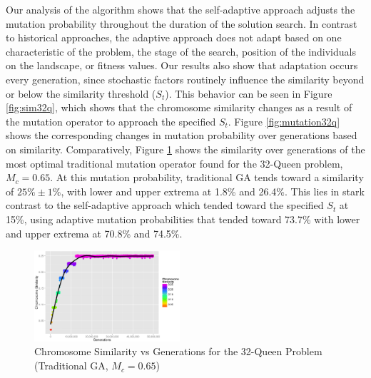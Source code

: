 \documentclass[conference]{IEEEtran}
\begin{document}
Our analysis of the algorithm shows that the self-adaptive approach adjusts the mutation probability throughout the duration of the solution search. In contrast to historical approaches, the adaptive approach does not adapt based on one characteristic of the problem, the stage of the search, position of the individuals on the landscape, or fitness values. Our results also show that adaptation occurs every generation, since stochastic factors routinely influence the similarity beyond or below the similarity threshold ($S_{t}$). This behavior can be seen in Figure \ref{fig:sim32q}, which shows that the chromosome similarity changes as a result of the mutation operator to approach the specified $S_{t}$. Figure \ref{fig:mutation32q} shows the corresponding changes in mutation probability over generations based on similarity. Comparatively, Figure \ref{fig:bestfixedn32q} shows the similarity over generations of the most optimal traditional mutation operator found for the 32-Queen problem, $M_{c} = 0.65$. At this mutation probability, traditional GA tends toward a similarity of $25\% \pm 1\%$, with lower and upper extrema at 1.8\% and 26.4\%. This lies in stark contrast to the self-adaptive approach which tended toward the specified $S_{t}$ at 15\%, using adaptive mutation probabilities that tended toward 73.7\% with lower and upper extrema at 70.8\% and 74.5\%.

\begin{figure}[htp]
\centerline{\includegraphics[width=0.48\textwidth]{figures/similarity_065_32q_3.png}}
\caption{Chromosome Similarity vs Generations for the 32-Queen Problem (Traditional GA, $M_{c} = 0.65$)} 
\label{fig:bestfixedn32q}
\end{figure}
\end{document}
